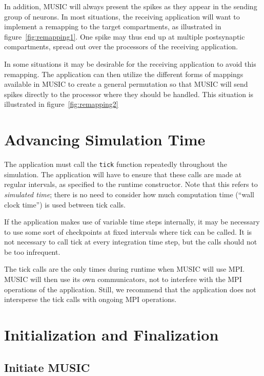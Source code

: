 \documentclass[a4paper,twoside]{report}
\begin{document}
In addition, MUSIC will always present the spikes as they appear in
the sending group of neurons.  In most situations, the receiving
application will want to implement a remapping to the target
compartments, as illustrated in figure~\ref{fig:remapping1}.  One spike
may thus end up at multiple postsynaptic compartments, spread out over
the processors of the receiving application.

In some situations it may be desirable for the receiving application
to avoid this remapping.  The application can then utilize the different
forms of mappings available in MUSIC to create a general permutation
so that MUSIC will send spikes directly to the processor where they
should be handled.  This situation is illustrated in
figure~\ref{fig:remapping2}


\section{Advancing Simulation Time}

The application must call the \lstinline|tick| function repeatedly
throughout the simulation.  The application will have to ensure that
these calls are made at regular intervals, as specified to the runtime
constructor.  Note that this refers to \emph{simulated time}; there is
no need to consider how much computation time (``wall clock time'') is
used between tick calls.

If the application makes use of variable time steps internally, it may
be necessary to use some sort of checkpoints at fixed intervals where
tick can be called.  It is not necessary to call tick at every
integration time step, but the calls should not be too infrequent.

The tick calls are the only times during runtime when MUSIC will use
MPI.  MUSIC will then use its own communicators, not to interfere with
the MPI operations of the application.  Still, we recommend that the
application does not intersperse the tick calls with ongoing MPI
operations.


\section{Initialization and Finalization}

\subsection{Initiate MUSIC}
\end{document}
